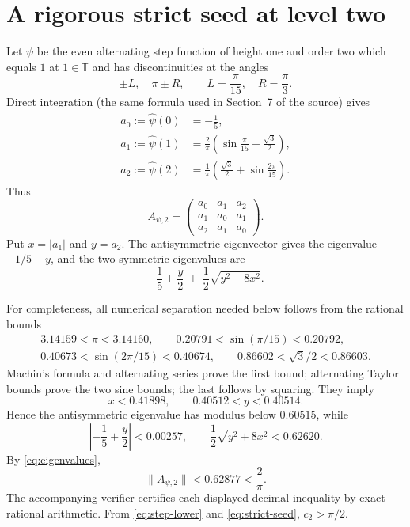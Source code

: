 \documentclass[10pt]{article}
\newcommand{\T}{\mathbb T}
\newcommand{\wh}[1]{\widehat{#1}}
\begin{document}
\section{A rigorous strict seed at level two}

Let $\psi$ be the even alternating step function of height one and order two
which equals $1$ at $1\in\T$ and has discontinuities at the angles
\[
 \pm L,\quad \pi\pm R,
 \qquad L=\frac{\pi}{15},\quad R=\frac{\pi}{3}.
\]
Direct integration (the same formula used in Section~7 of the source) gives
\begin{align}
 a_0:=\wh\psi(0)&=-\frac15,\label{eq:a0}\\
 a_1:=\wh\psi(1)&=\frac2\pi
   \left(\sin\frac{\pi}{15}-\frac{\sqrt3}{2}\right),\label{eq:a1}\\
 a_2:=\wh\psi(2)&=\frac1\pi
   \left(\frac{\sqrt3}{2}+\sin\frac{2\pi}{15}\right).\label{eq:a2}
\end{align}
Thus
\[
 A_{\psi,2}=
 \begin{pmatrix}a_0&a_1&a_2\\a_1&a_0&a_1\\a_2&a_1&a_0\end{pmatrix}.
\]
Put $x=|a_1|$ and $y=a_2$. The antisymmetric eigenvector gives the eigenvalue
$-1/5-y$, and the two symmetric eigenvalues are
\begin{equation}\label{eq:eigenvalues}
 -\frac15+\frac y2\ \pm\ \frac12\sqrt{y^2+8x^2}.
\end{equation}

For completeness, all numerical separation needed below follows from the
rational bounds
\begin{gather*}
 3.14159<\pi<3.14160,\qquad
 0.20791<\sin(\pi/15)<0.20792,\\
 0.40673<\sin(2\pi/15)<0.40674,\qquad
 0.86602<\sqrt3/2<0.86603.
\end{gather*}
Machin's formula and alternating series prove the first bound; alternating
Taylor bounds prove the two sine bounds; the last follows by squaring. They
imply
\[
 x<0.41898,\qquad 0.40512<y<0.40514.
\]
Hence the antisymmetric eigenvalue has modulus below $0.60515$, while
\[
 \left|-\frac15+\frac y2\right|<0.00257,
 \qquad
 \frac12\sqrt{y^2+8x^2}<0.62620.
\]
By \eqref{eq:eigenvalues},
\begin{equation}\label{eq:strict-seed}
 \|A_{\psi,2}\|<0.62877<\frac2\pi.
\end{equation}
The accompanying verifier certifies each displayed decimal inequality by
exact rational arithmetic. From \eqref{eq:step-lower} and
\eqref{eq:strict-seed}, $c_2>\pi/2$.
\end{document}
